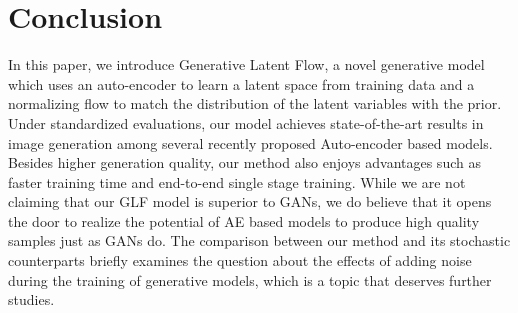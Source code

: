 \documentclass{article}
\begin{document}
\section{Conclusion}
In this paper, we introduce Generative Latent Flow, a novel generative model which uses an auto-encoder to learn a latent space from training data and a normalizing flow to match the distribution of the latent variables with the prior. Under standardized evaluations, our model achieves state-of-the-art results in image generation among several recently proposed Auto-encoder based models. Besides higher generation quality, our method also enjoys advantages such as faster training time and end-to-end single stage training. While we are not claiming that our GLF model is superior to GANs, we do believe that it opens the door to realize the potential of AE based models to produce high quality samples just as GANs do. The comparison between our method and its stochastic counterparts briefly examines the question about the effects of adding noise during the training of generative models, which is a topic that deserves further studies.  
\end{document}
